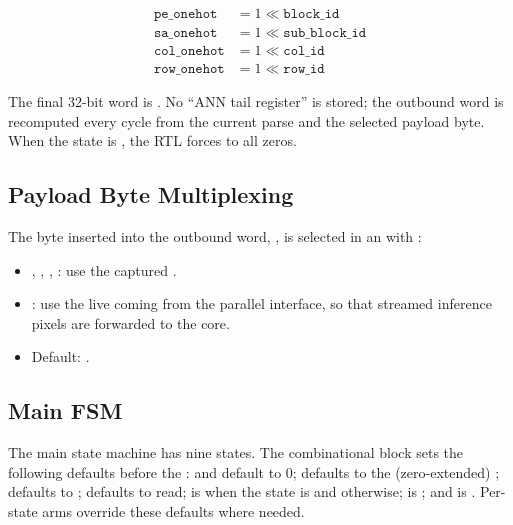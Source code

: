 \begin{align*}
    \texttt{pe\_onehot}  &= 1 \ll \texttt{block\_id} \\
    \texttt{sa\_onehot}  &= 1 \ll \texttt{sub\_block\_id} \\
    \texttt{col\_onehot} &= 1 \ll \texttt{col\_id} \\
    \texttt{row\_onehot} &= 1 \ll \texttt{row\_id}
\end{align*}

The final 32-bit word is
.
No ``ANN tail register'' is stored; the outbound word is recomputed every
cycle from the current  parse and the selected
payload byte. When the state is , the RTL forces
 to all zeros.

\subsection{Payload Byte Multiplexing}
\label{sec:rtl-controller-data}

The byte inserted into the outbound word,
, is selected in an  with
:

\begin{itemize}
    \item {}, , ,
          : use the captured .
    \item {}: use the live 
          coming from the parallel interface, so that streamed
          inference pixels are forwarded to the core.
    \item Default: .
\end{itemize}

\subsection{Main FSM}
\label{sec:rtl-controller-mainfsm}

The main state machine has nine states. The combinational block sets the
following defaults before the : 
and  default to 0;  defaults to the
(zero-extended) ;  defaults
to ;  defaults to read;
 is  when the state is
 and  otherwise;  is
; and  is .
Per-state arms override these defaults where needed.

